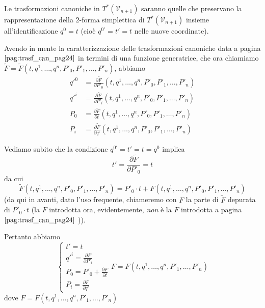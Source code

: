 Le trasformazioni canoniche in $T^* (\mathcal{V}_{n+1})$ saranno quelle che preservano la rappresentazione della $2$-forma simplettica di $T^* (\mathcal{V}_{n+1})$ insieme all'identificazione $q^0 = t$ (cioè $q^{0'} = t' = t$ nelle nuove coordinate).

Avendo in mente la caratterizzazione delle trasformazioni canoniche data a pagina $\pageref{pag:trasf_can_pag24}$ in termini di una funzione generatrice, che ora chiamiamo $ \tilde{F} = \tilde{F} (t, q^1, \dots , q^n, P'_0, P'_1, \dots , P'_n) $, abbiamo
\begin{align*}
	q'^0 &= \frac{\partial \tilde{F}}{\partial P'_0} (t, q^1, \dots , q^n, P'_0, P'_1, \dots , P'_n) \\
	q'^i &= \frac{\partial \tilde{F}}{\partial P'_i} (t, q^1, \dots , q^n, P'_0, P'_1, \dots , P'_n) \\
	P_0 &= \frac{\partial \tilde{F}}{\partial t} (t, q^1, \dots , q^n, P'_0, P'_1, \dots , P'_n) \\
	P_i &= \frac{\partial \tilde{F}}{\partial q^i} (t, q^1, \dots , q^n, P'_0, P'_1, \dots , P'_n)
\end{align*}

Vediamo subito che la condizione $ q^{0'} = t' = t = q^0 $ implica
\begin{equation*}
	t' = \frac{\partial \tilde{F}}{\partial P'_0} = t
\end{equation*}
da cui
\begin{equation*}
	 \tilde{F} (t, q^1, \dots , q^n, P'_0, P'_1, \dots , P'_n) = P'_0 \cdot t + F (t, q^1, \dots , q^n, P'_0, P'_1, \dots , P'_n)
\end{equation*}
(da qui in avanti, dato l'uso frequente, chiameremo con $ F $ la parte di $ \tilde{F} $ depurata di $ P'_0 \cdot t $ (la $ F $ introdotta ora, evidentemente, \textit{non} è la $ F $ introdotta a pagina $ \pageref{pag:trasf_can_pag24} $ )).

Pertanto abbiamo
\begin{equation*}
\begin{cases}
	t' = t\\
	q'^i = \frac{\partial F}{\partial P'_i}\\
	P_0 = P'_0 + \frac{\partial F}{\partial t}\\
	P_i = \frac{\partial F}{\partial q^i}
\end{cases}
	F = F (t, q^1, \dots , q^n, P'_1, \dots , P'_n)
\end{equation*}
dove $ F = F (t, q^1, \dots , q^n, P'_1, \dots , P'_n) $

